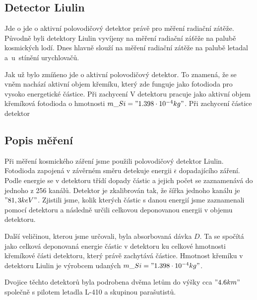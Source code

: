 \documentclass[12pt,a4paper]{article}
\begin{document}
\subsection*{Detector Liulin}
Jde o jde o aktivní polovodičový detektor právě pro měření radiační zátěže.
Původně byli detektory Liulin vyvíjeny na měření radiační záťěže na palubě
kosmických lodí. Dnes hlavně slouží na měření radiační zátěže na palubě letadal
a~u~stínění urychlovačů.\par Jak už bylo zmíňeno jde o aktivní polovodičový
detektor. To znamená, že se vněm nachází aktivní objem křemíku, který zde
funguje jako fotodioda pro vysoko energetické částice. Při zachycení %
V detektoru pracuje jako aktivní objem křemíková fotodioda o hmotnosti
$m\_{Si}="1.398\cdot 10^{-4} kg"$. Při zachycení částice detektor
\subsection*{Popis měření}
Při měření kosmického záření jsme použili polovodičový detektor Liulin. Fotodioda zapojená v závěrném směru
detekuje energii $ \overline{\epsilon} $ dopadajícího záření. Podle energie se v detektoru třídí dopady
částic a jejich počet se zaznamenává do jednoho z 256 kanálů. Detektor je zkalibrován tak, že šířka jednoho
kanálu je $"81,3 keV"$. Zjistili jsme, kolik kterých částic s danou energií jsme zaznamenali pomocí detektoru a
následně určili celkovou deponovanou energii v objemu detektoru.\par
Další veličinou, kterou jsme určovali, byla absorbovaná dávka $D$. Ta se spočítá jako celková deponovaná
energie částic v detektoru ku celkové hmotnosti křemíkové části detektoru, který právě zachytává částice.
Hmotnost křemíku v detektoru Liulin je výrobcem udaných $m\_{Si}="1.398\cdot 10^{-4} kg"$.\par
Dvojice těchto detektorů byla podrobena dvěma letům do výšky cca $"4.6 km"$ společně s pilotem letadla
L-410 a skupinou parašutistů.
\end{document}

